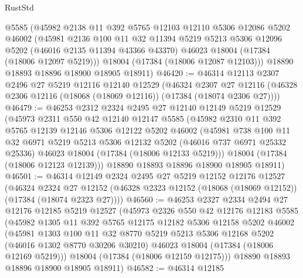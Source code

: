 \begin{lexlean}{RustStd}
\begin{coremodule}
      @5585
      (@45982
        @2138
        @11
        @392
        @5765
        @12103
        @12110
        @5306
        @12086
        @5202
        @46002
        (@45981
          @2136
          @100
          @11
          @32
          @11394
          @5219
          @5213
          @5306
          @12096
          @5202
          (@46016 @2135 @11394 @43366 @43370)
          @46023
          @18004
          (@17384 (@18006 @12097 @5219)))
        @18004
        (@17384 (@18006 @12087 @12103)))
      @18890
      @18893
      @18896
      @18900
      @18905
      @18911)
@46420 := @46314
    @12113
    @2307
    @2496
    @27
    @5219
    @12116
    @12140
    @12529
    (@46324
      @2307
      @27
      @12116
      (@46328 @2306 @12116 (@18068 (@18069 @12116)) (@17384 (@18074 @2306 @27))))
@46479 := @46253
    @2312
    @2324
    @2495
    @27
    @12140
    @12149
    @5219
    @12529
    (@45973
      @2311
      @550
      @42
      @12140
      @12147
      @5585
      (@45982
        @2310
        @11
        @392
        @5765
        @12139
        @12146
        @5306
        @12122
        @5202
        @46002
        (@45981
          @738
          @100
          @11
          @32
          @6971
          @5219
          @5213
          @5306
          @12132
          @5202
          (@46016 @737 @6971 @25332 @25336)
          @46023
          @18004
          (@17384 (@18006 @12133 @5219)))
        @18004
        (@17384 (@18006 @12123 @12139)))
      @18890
      @18893
      @18896
      @18900
      @18905
      @18911)
@46501 := @46314
    @12149
    @2324
    @2495
    @27
    @5219
    @12152
    @12176
    @12527
    (@46324
      @2324
      @27
      @12152
      (@46328 @2323 @12152 (@18068 (@18069 @12152)) (@17384 (@18074 @2323 @27))))
@46560 := @46253
    @2327
    @2334
    @2494
    @27
    @12176
    @12185
    @5219
    @12527
    (@45973
      @2326
      @550
      @42
      @12176
      @12183
      @5585
      (@45982
        @1305
        @11
        @392
        @5765
        @12175
        @12182
        @5306
        @12158
        @5202
        @46002
        (@45981
          @1303
          @100
          @11
          @32
          @8770
          @5219
          @5213
          @5306
          @12168
          @5202
          (@46016 @1302 @8770 @30206 @30210)
          @46023
          @18004
          (@17384 (@18006 @12169 @5219)))
        @18004
        (@17384 (@18006 @12159 @12175)))
      @18890
      @18893
      @18896
      @18900
      @18905
      @18911)
@46582 := @46314
    @12185

\end{coremodule}
\end{lexlean}
